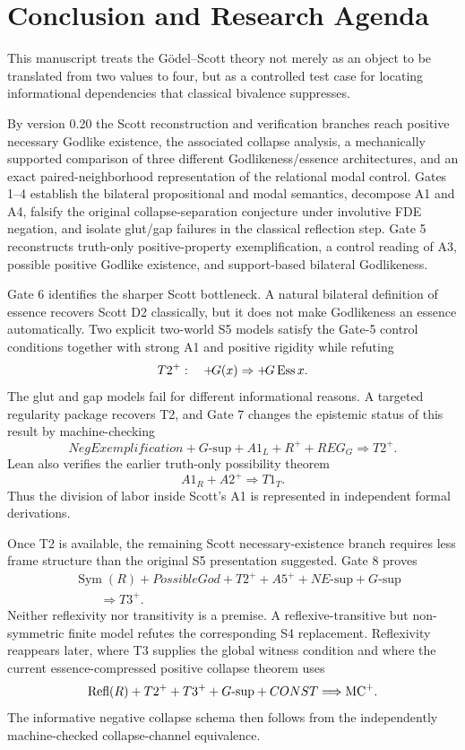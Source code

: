 \section{Conclusion and Research Agenda}
\label{sec:conclusion}

This manuscript treats the G\"odel--Scott theory not merely as an object to be translated from two values to four, but as a controlled test case for locating informational dependencies that classical bivalence suppresses.

By version 0.20 the Scott reconstruction and verification branches reach positive necessary Godlike existence, the associated collapse analysis, a mechanically supported comparison of three different Godlikeness/essence architectures, and an exact paired-neighborhood representation of the relational modal control. Gates 1--4 establish the bilateral propositional and modal semantics, decompose A1 and A4, falsify the original collapse-separation conjecture under involutive FDE negation, and isolate glut/gap failures in the classical reflection step. Gate 5 reconstructs truth-only positive-property exemplification, a control reading of A3, possible positive Godlike existence, and support-based bilateral Godlikeness.

Gate 6 identifies the sharper Scott bottleneck. A natural bilateral definition of essence recovers Scott D2 classically, but it does not make Godlikeness an essence automatically. Two explicit two-world S5 models satisfy the Gate-5 control conditions together with strong A1 and positive rigidity while refuting
\[
  T2^+:\quad
  +\!G(x)\Rightarrow+\!G\operatorname{Ess}x.
\]
The glut and gap models fail for different informational reasons. A targeted regularity package recovers T2, and Gate 7 changes the epistemic status of this result by machine-checking
\[
  NegExemplification
  +G\text{-sup}
  +A1_L
  +R^+
  +REG_G
  \Longrightarrow T2^+.
\]
Lean also verifies the earlier truth-only possibility theorem
\[
  A1_R+A2^+\Longrightarrow T1_T.
\]
Thus the division of labor inside Scott's A1 is represented in independent formal derivations.

Once T2 is available, the remaining Scott necessary-existence branch requires less frame structure than the original S5 presentation suggested. Gate 8 proves
\[
\begin{split}
  &\operatorname{Sym}(R)
  +PossibleGod
  +T2^+
  +A5^+
  +NE\text{-sup}
  +G\text{-sup}\\
  &\qquad\Longrightarrow T3^+.
\end{split}
\]
Neither reflexivity nor transitivity is a premise. A reflexive-transitive but non-symmetric finite model refutes the corresponding S4 replacement. Reflexivity reappears later, where T3 supplies the global witness condition and where the current essence-compressed positive collapse theorem uses
\[
  \operatorname{Refl}(R)+T2^++T3^++G\text{-sup}+CONST
  \Longrightarrow\mathrm{MC}^{+}.
\]
The informative negative collapse schema then follows from the independently machine-checked collapse-channel equivalence.

